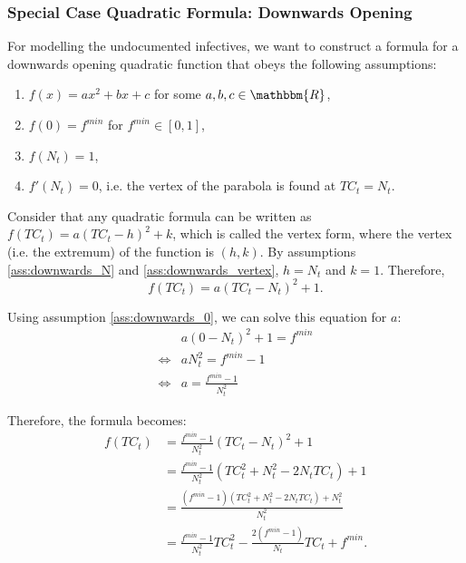 \documentclass[12pt]{article}
\newcommand{\R}{\mathbbm{R}}
\begin{document}
\begin{appendices}
		\subsubsection{Special Case Quadratic Formula: Downwards Opening} \label{ssapp:downwards_derivation_vertex}
		For modelling the undocumented infectives, we want to construct a formula for a downwards opening quadratic function that obeys the following assumptions:
		\begin{enumerate}[label=(\Roman*)]
		    \item\label{ass:downwards_formula} $f(x) = ax^2 + bx + c$  for some $a, b, c \in \R$,
		    \item\label{ass:downwards_0} $f(0) = f^{min}$ for $f^{min} \in [0,1]$,
		    \item\label{ass:downwards_N} $f(N_t) = 1$,
		    \item\label{ass:downwards_vertex} $f'(N_t) = 0$, i.e. the vertex of the parabola is found at $TC_t = N_t$.
		\end{enumerate}
		
		Consider that any quadratic formula can be written as $f(TC_t) = a(TC_t - h)^2 + k$, which is called the vertex form, where the vertex (i.e. the extremum) of the function is $(h, k)$. By assumptions \ref{ass:downwards_N} and \ref{ass:downwards_vertex}, $h=N_t$ and $k=1$. Therefore,
		    \[f(TC_t) = a(TC_t - N_t)^2 + 1.\]
		    
		\noindent Using assumption \ref{ass:downwards_0}, we can solve this equation for $a$:
		    \begin{align*}
		        & a(0 - N_t)^2 + 1 = f^{min}\\
		        \iff & aN_t^2 = f^{min} - 1\\
		        \iff & a = \frac{f^{min} - 1}{N_t^2}
		    \end{align*}
		    
		\noindent Therefore, the formula becomes:
		    \begin{align*}
		        f(TC_t) &= \frac{f^{min} - 1}{N_t^2}(TC_t - N_t)^2 + 1 \\
		        &= \frac{f^{min} - 1}{N_t^2}(TC_t^2 + N_t^2 -2N_tTC_t) + 1 \\
		        &= \frac{(f^{min} - 1)(TC_t^2 + N_t^2 -2N_tTC_t) + N_t^2}{N_t^2}\\
                &= \frac{f^{min} - 1}{N_t^2}TC_t^2 - \frac{2(f^{min} - 1)}{N_t}TC_t + f^{min}.
		    \end{align*}
		

\end{appendices}
\end{document}
